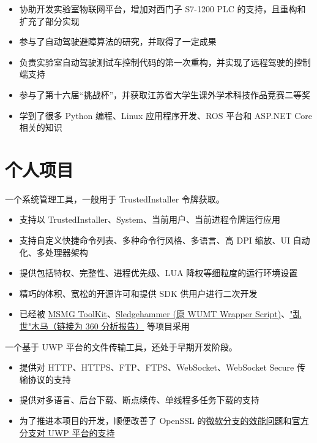 \documentclass{resume}
\begin{document}
\begin{itemize}
  \item 协助开发实验室物联网平台，增加对西门子 S7-1200 PLC 的支持，且重构和扩充了部分实现
  \item 参与了自动驾驶避障算法的研究，并取得了一定成果
  \item 负责实验室自动驾驶测试车控制代码的第一次重构，并实现了远程驾驶的控制端支持
  \item 参与了第十六届“挑战杯”，并获取江苏省大学生课外学术科技作品竞赛二等奖
  \item 学到了很多 Python 编程、Linux 应用程序开发、ROS 平台和 ASP.NET Core 相关的知识
\end{itemize}

\section{个人项目}

一个系统管理工具，一般用于 TrustedInstaller 令牌获取。
\begin{itemize}
  \item 支持以 TrustedInstaller、System、当前用户、当前进程令牌运行应用
  \item 支持自定义快捷命令列表、多种命令行风格、多语言、高 DPI 缩放、UI 自动化、多处理器架构
  \item 提供包括特权、完整性、进程优先级、LUA 降权等细粒度的运行环境设置
  \item 精巧的体积、宽松的开源许可和提供 SDK 供用户进行二次开发
  \item 已经被 \href{https://forums.mydigitallife.net/threads/50572/}{MSMG ToolKit}、\href{https://forums.mydigitallife.net/threads/72203/}{Sledgehammer (原 WUMT Wrapper Script)}、\href{http://www.360.cn/n/10477.html}{"乱世"木马（链接为 360 分析报告）} 等项目采用
\end{itemize}

一个基于 UWP 平台的文件传输工具，还处于早期开发阶段。
\begin{itemize}
  \item 提供对 HTTP、HTTPS、FTP、FTPS、WebSocket、WebSocket Secure 传输协议的支持
  \item 提供对多语言、后台下载、断点续传、单线程多任务下载的支持
  \item 为了推进本项目的开发，顺便改善了 OpenSSL 的\href{https://github.com/microsoft/openssl/pull/61}{微软分支的效能问题}和\href{https://github.com/openssl/openssl/blob/42b3f10b5e461496aab1f74d24103d6902ebfcd5/CHANGES#L350}{官方分支对 UWP 平台的支持}
\end{itemize}
\end{document}
